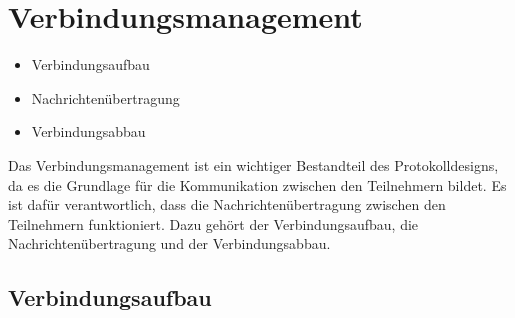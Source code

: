 \section{Verbindungsmanagement}
\label{subsec:verbindungsmanagement}

\begin{itemize}
    \item Verbindungsaufbau
    \item Nachrichtenübertragung
    \item Verbindungsabbau
\end{itemize}


\noindent Das Verbindungsmanagement ist ein wichtiger Bestandteil des Protokolldesigns, da es die Grundlage für die Kommunikation zwischen den Teilnehmern bildet. Es ist dafür verantwortlich, dass die Nachrichtenübertragung zwischen den Teilnehmern funktioniert. Dazu gehört der Verbindungsaufbau, die Nachrichtenübertragung und der Verbindungsabbau.

\subsection{Verbindungsaufbau}

